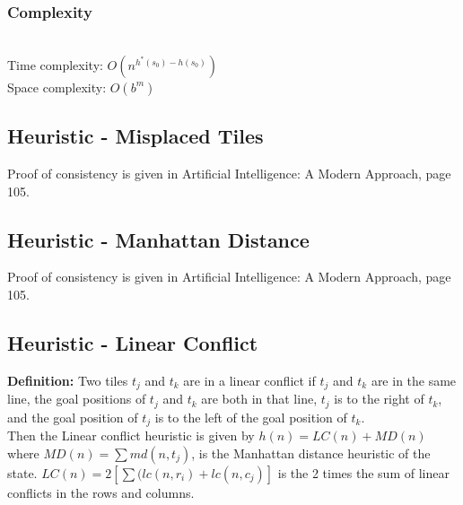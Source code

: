 \documentclass{llncs}
\begin{document}
\subsubsection{Complexity}\hfill\\
Time complexity: $O(n^{h^*(s_0)-h(s_0)})$\\
Space complexity: $O(b^m)$

\subsection{Heuristic - Misplaced Tiles}

Proof of consistency is given in Artificial Intelligence: A Modern Approach, page 105.

\subsection{Heuristic - Manhattan Distance}

Proof of consistency is given in Artificial Intelligence: A Modern Approach, page 105.

\subsection{Heuristic - Linear Conflict}

\textbf{Definition:}
Two tiles $t_j$ and $t_k$ are in a linear conflict 
if $t_j$ and $t_k$ are in the same line, the goal positions of $t_j$ and $t_k$ 
are both in that line, $t_j$ is to the right of $t_k$, and the goal position of $t_j$
is to the left of the goal position of $t_k$. \\
Then the Linear conflict heuristic is given by $h(n) = LC(n) + MD(n)$ where $MD(n)=\sum md(n,t_j)$, is the Manhattan distance heuristic of the state. $LC(n) = 2[\sum(lc(n,r_i) +lc(n,c_j)]$ is the 2 times the sum of linear conflicts in the rows and columns. \\
\end{document}
